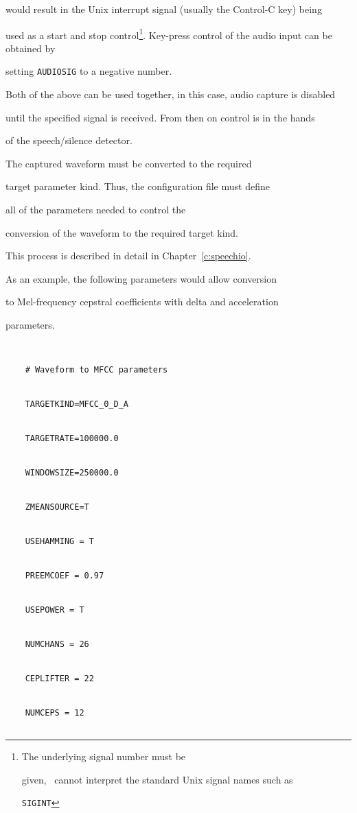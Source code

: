 would result in the Unix interrupt signal (usually the Control-C key) being


used as a start and stop control\footnote{ The underlying signal number must be


given, \HTK\ cannot interpret the standard Unix signal names such as


\texttt{SIGINT} }. Key-press control of the audio input can be obtained by


setting \texttt{AUDIOSIG} to a negative number.





Both of the above can be used together, in this case, audio capture is disabled


until the specified signal is received.  From then on control is in the hands


of the speech/silence detector.





The captured waveform must be converted to the required 


target parameter kind.  Thus, the configuration file must define


all of the parameters needed to control the


conversion of the waveform to the required target kind.


This process is described in detail in Chapter~\ref{c:speechio}.


As an example, the following parameters would allow conversion


to Mel-frequency cepstral coefficients with delta and acceleration


parameters.


\begin{verbatim}


    # Waveform to MFCC parameters


    TARGETKIND=MFCC_0_D_A


    TARGETRATE=100000.0


    WINDOWSIZE=250000.0


    ZMEANSOURCE=T


    USEHAMMING = T


    PREEMCOEF = 0.97


    USEPOWER = T


    NUMCHANS = 26


    CEPLIFTER = 22


    NUMCEPS = 12


\end{verbatim}


